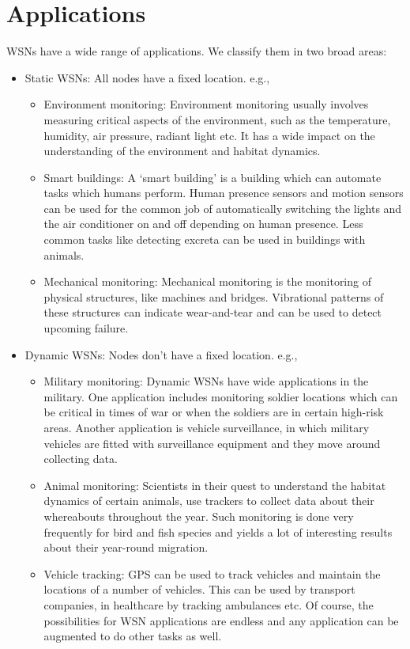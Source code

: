 \documentclass[twocolumn]{article}
\begin{document}
\section{Applications}
WSNs have a wide range of applications. We classify them in two broad areas:
\begin{itemize}
\item Static WSNs: All nodes have a fixed location. e.g.,\
\begin{itemize}
\item Environment monitoring: Environment monitoring usually involves measuring critical aspects of the environment, such as the temperature, humidity, air pressure, radiant light etc. It has a wide impact on the understanding of the environment and habitat dynamics.
\item Smart buildings: A `smart building' is a building which can automate tasks which humans perform. Human presence sensors and motion sensors can be used for the common job of automatically switching the lights and the air conditioner on and off depending on human presence. Less common tasks like detecting excreta can be used in buildings with animals.
\item Mechanical monitoring: Mechanical monitoring is the monitoring of physical structures, like machines and bridges. Vibrational patterns of these structures can indicate wear-and-tear and can be used to detect upcoming failure.
\end{itemize}
\item Dynamic WSNs: Nodes don't have a fixed location. e.g.,\
\begin{itemize}
\item Military monitoring: Dynamic WSNs have wide applications in the military. One application includes monitoring soldier locations which can be critical in times of war or when the soldiers are in certain high-risk areas. Another application is vehicle surveillance, in which military vehicles are fitted with surveillance equipment and they move around collecting data.
\item Animal monitoring: Scientists in their quest to understand the habitat dynamics of certain animals, use trackers to collect data about their whereabouts throughout the year. Such monitoring is done very frequently for bird and fish species and yields a lot of interesting results about their year-round migration.
\item Vehicle tracking: GPS can be used to track vehicles and maintain the locations of a number of vehicles. This can be used by transport companies, in healthcare by tracking ambulances etc.
Of course, the possibilities for WSN applications are endless and any application can be augmented to do other tasks as well.
\end{itemize}
\end{itemize}
\end{document}
